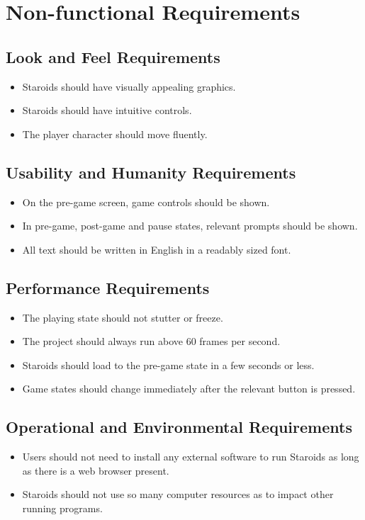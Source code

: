 \documentclass[12pt, titlepage]{article}
\begin{document}
\section{Non-functional Requirements}

\subsection{Look and Feel Requirements}
  \begin{itemize}
    \item Staroids should have visually appealing graphics.
    \item Staroids should have intuitive controls.
    \item The player character should move fluently.
  \end{itemize}

\subsection{Usability and Humanity Requirements}
  \begin{itemize}
    \item On the pre-game screen, game controls should be shown.
    \item In pre-game, post-game and pause states, relevant prompts should be shown.
    \item All text should be written in English in a readably sized font.
  \end{itemize}

\subsection{Performance Requirements}
  \begin{itemize}
    \item The playing state should not stutter or freeze.
    \item The project should always run above 60 frames per second.
    \item Staroids should load to the pre-game state in a few seconds or less.
    \item Game states should change immediately after the relevant button is pressed.
  \end{itemize}

\subsection{Operational and Environmental Requirements}
  \begin{itemize}
    \item Users should not need to install any external software to run Staroids as long as there is a web browser present.
    \item Staroids should not use so many computer resources as to impact other running programs.
  \end{itemize}
\end{document}
